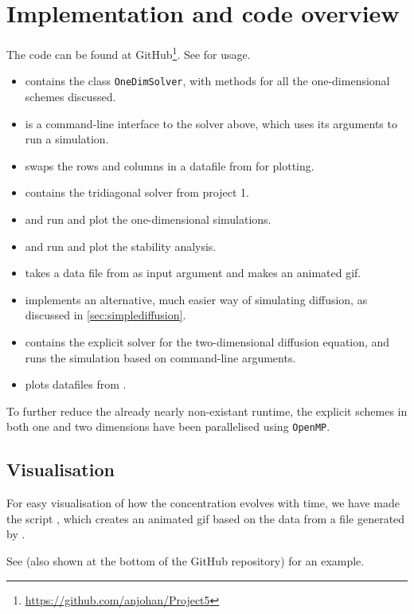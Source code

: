 \section{Implementation and code overview}
The code can be found at GitHub\footnote{\url{https://github.com/anjohan/Project5}}. See  for usage.

\begin{itemize}
\item {} contains the class \texttt{OneDimSolver}, with methods for all the one-dimensional schemes discussed.
\item {} is a command-line interface to the solver above, which uses its arguments to run a simulation.
\item {} swaps the rows and columns in a datafile from  for plotting.
\item {} contains the tridiagonal solver from project 1.
\item {} and  run and plot the one-dimensional simulations.
\item {} and  run and plot the stability analysis.
\item {} takes a data file from  as input argument and makes an animated gif.
\item {} implements an alternative, much easier way of simulating diffusion, as discussed in \ref{sec:simplediffusion}.
\item {} contains the explicit solver for the two-dimensional diffusion equation, and runs the simulation based on command-line arguments.
\item {} plots datafiles from .
\end{itemize}
To further reduce the already nearly non-existant runtime, the explicit schemes in both one and two dimensions have been parallelised using \texttt{OpenMP}.

\subsection{Visualisation}
For easy visualisation of how the concentration evolves with time, we have made the script , which creates an animated gif based on the data from a file generated by .

See  (also shown at the bottom of the GitHub repository) for an example.
